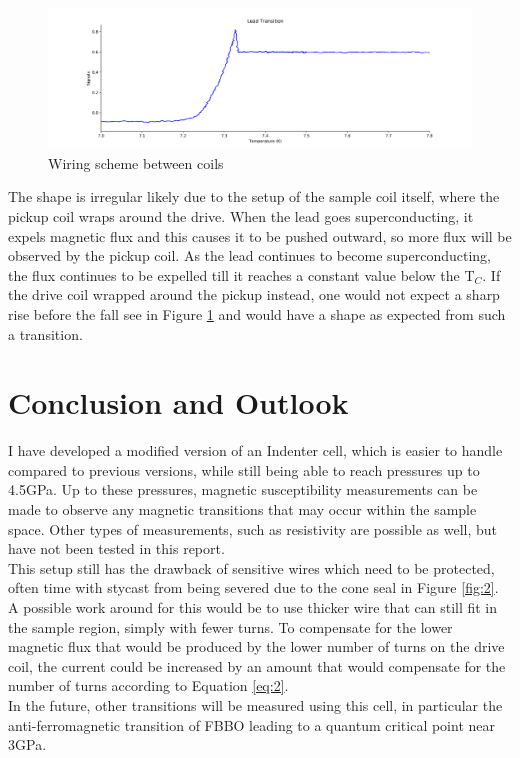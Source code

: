 \documentclass[11pt,onecolumn]{article}
\begin{document}
\begin{figure}[ht]
	\centering
	\includegraphics[width=.8\columnwidth]{figures/lead.png}
	\caption{Wiring scheme between coils}
	\label{fig:9}
\end{figure}

The shape is irregular likely due to the setup of the sample coil itself, where the pickup coil wraps around the drive. When the lead goes superconducting, it expels magnetic flux and this causes it to be pushed outward, so more flux will be observed by the pickup coil. As the lead continues to become superconducting, the flux continues to be expelled till it reaches a constant value below the T$_C$. If the drive coil wrapped around the pickup instead, one would not expect a sharp rise before the fall see in Figure \ref{fig:9} and would have a shape as expected from such a transition.

\section{Conclusion and Outlook}

I have developed a modified version of an Indenter cell, which is easier to handle compared to previous versions, while still being able to reach pressures up to 4.5GPa. Up to these pressures, magnetic susceptibility measurements can be made to observe any magnetic transitions that may occur within the sample space. Other types of measurements, such as resistivity are possible as well, but have not been tested in this report.\\

This setup still has the drawback of sensitive wires which need to be protected, often time with stycast from being severed due to the cone seal in Figure \ref{fig:2}. A possible work around for this would be to use thicker wire that can still fit in the sample region, simply with fewer turns. To compensate for the lower magnetic flux that would be produced by the lower number of turns on the drive coil, the current could be increased by an amount that would compensate for the number of turns according to Equation \ref{eq:2}.\\

In the future, other transitions will be measured using this cell, in particular the anti-ferromagnetic transition of FBBO leading to a quantum critical point near 3GPa.\cite{FBBO}



\end{document}
